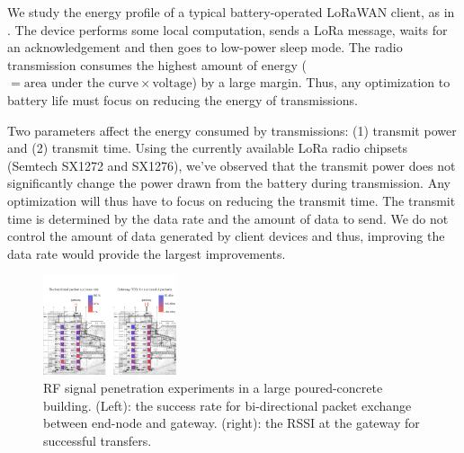 
We study the energy profile of a typical battery-operated LoRaWAN client, as in . The device performs some local computation, sends a LoRa message, waits for an acknowledgement and then goes to low-power sleep mode. The radio transmission consumes the highest amount of energy ($= \text{area under the curve} \times \text{voltage}$) by a large margin. Thus, any optimization to battery life must focus on reducing the energy of transmissions.

Two parameters affect the energy consumed by transmissions: (1) transmit power and (2) transmit time. Using the currently available LoRa radio chipsets (Semtech SX1272 and SX1276), we've observed that the transmit power does not significantly change the power drawn from the battery during transmission. Any optimization will thus have to focus on reducing the transmit time. The transmit time is determined by the data rate and the amount of data to send. We do not control the amount of data generated by client devices and thus, improving the data rate would provide the largest improvements.

\begin{figure}[!h]
\centering
\includegraphics[width=0.35\textwidth]{figures/penetration_test_wean_cropped}
\caption{RF signal penetration experiments in a large poured-concrete building. (Left): the success rate for bi-directional packet exchange between end-node and gateway. (right): the RSSI at the gateway for successful transfers.}
\label{fig:penetration-test}
\compactimg
\end{figure}

